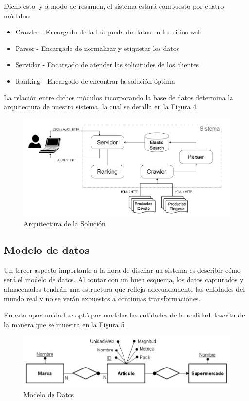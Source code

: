 \documentclass[12pt]{article} %
\begin{document}
Dicho esto, y a modo de resumen, el sistema estará compuesto por cuatro módulos:
\begin{itemize}
	\item Crawler     - Encargado de la búsqueda de datos en los sitios web
	\item Parser     - Encargado de normalizar y etiquetar los datos
	\item Servidor     - Encargado de atender las solicitudes de los clientes
	\item Ranking     - Encargado de encontrar la solución óptima 
\end{itemize}


La relación entre dichos módulos incorporando la base de datos determina la arquitectura de nuestro sistema, la cual se detalla en la Figura 4.

\begin{figure}[H]
\includegraphics[scale=.9]{arquitectura}
\centering
\caption{Arquitectura de la Solución}
\end{figure}



\subsection{Modelo de datos}

Un tercer aspecto importante a la hora de diseñar un sistema es describir cómo será el modelo de datos. Al contar con un buen esquema, los datos capturados y almacenados tendrán una estructura que refleja adecuadamente las entidades del mundo real y no se verán expuestos a continuas transformaciones.

En esta oportunidad se optó por modelar las entidades de la realidad descrita de la manera que se muestra en la Figura 5.

\begin{figure}[H]
\includegraphics[scale=1]{modelo_de_datos}
\centering
\caption{Modelo de Datos}
\end{figure}
\end{document}

